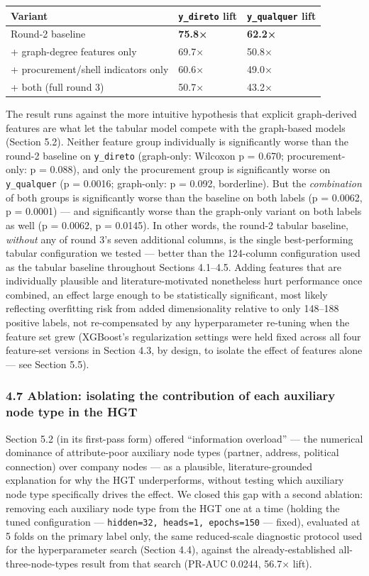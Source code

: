 \documentclass[11pt,]{article}
\begin{document}
\begin{longtable}[]{@{}lll@{}}
\toprule
Variant & \texttt{y\_direto} lift & \texttt{y\_qualquer}
lift\tabularnewline
\midrule
\endhead
Round-2 baseline & \textbf{75.8×} & \textbf{62.2×}\tabularnewline
+ graph-degree features only & 69.7× & 50.8×\tabularnewline
+ procurement/shell indicators only & 60.6× & 49.0×\tabularnewline
+ both (full round 3) & 50.7× & 43.2×\tabularnewline
\bottomrule
\end{longtable}

The result runs against the more intuitive hypothesis that explicit
graph-derived features are what let the tabular model compete with the
graph-based models (Section 5.2). Neither feature group individually is
significantly worse than the round-2 baseline on \texttt{y\_direto}
(graph-only: Wilcoxon p = 0.670; procurement-only: p = 0.088), and only
the procurement group is significantly worse on \texttt{y\_qualquer} (p
= 0.0016; graph-only: p = 0.092, borderline). But the \emph{combination}
of both groups is significantly worse than the baseline on both labels
(p = 0.0062, p = 0.0001) --- and significantly worse than the graph-only
variant on both labels as well (p = 0.0062, p = 0.0145). In other words,
the round-2 tabular baseline, \emph{without} any of round 3's seven
additional columns, is the single best-performing tabular configuration
we tested --- better than the 124-column configuration used as the
tabular baseline throughout Sections 4.1--4.5. Adding features that are
individually plausible and literature-motivated nonetheless hurt
performance once combined, an effect large enough to be statistically
significant, most likely reflecting overfitting risk from added
dimensionality relative to only 148--188 positive labels, not
re-compensated by any hyperparameter re-tuning when the feature set grew
(XGBoost's regularization settings were held fixed across all four
feature-set versions in Section 4.3, by design, to isolate the effect of
features alone --- see Section 5.5).

\hypertarget{ablation-isolating-the-contribution-of-each-auxiliary-node-type-in-the-hgt}{%
\subsubsection{4.7 Ablation: isolating the contribution of each
auxiliary node type in the
HGT}\label{ablation-isolating-the-contribution-of-each-auxiliary-node-type-in-the-hgt}}

Section 5.2 (in its first-pass form) offered ``information overload''
--- the numerical dominance of attribute-poor auxiliary node types
(partner, address, political connection) over company nodes --- as a
plausible, literature-grounded explanation for why the HGT
underperforms, without testing which auxiliary node type specifically
drives the effect. We closed this gap with a second ablation: removing
each auxiliary node type from the HGT one at a time (holding the tuned
configuration --- \texttt{hidden=32,\ heads=1,\ epochs=150} --- fixed),
evaluated at 5 folds on the primary label only, the same reduced-scale
diagnostic protocol used for the hyperparameter search (Section 4.4),
against the already-established all-three-node-types result from that
search (PR-AUC 0.0244, 56.7× lift).
\end{document}

